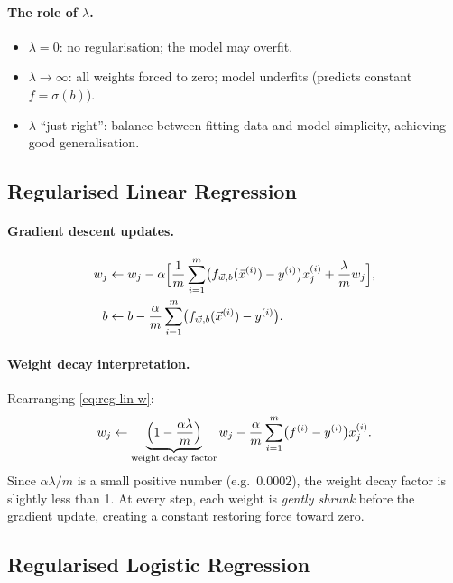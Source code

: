 \paragraph{The role of $\lambda$.}
\begin{itemize}
\item $\lambda=0$: no regularisation; the model may overfit.
\item $\lambda\to\infty$: all weights forced to zero; model underfits
  (predicts constant $f=\sigma(b)$).
\item $\lambda$ ``just right'': balance between fitting data and model
  simplicity, achieving good generalisation.
\end{itemize}

\subsection{Regularised Linear Regression}

\paragraph{Gradient descent updates.}
\begin{align}
w_j&\leftarrow w_j-\alpha\Bigl[\frac{1}{m}\sum_{i=1}^m
  \bigl(f_{\vec{w},b}(\vec{x}^{(i)})-y^{(i)}\bigr)x_j^{(i)}
  +\frac{\lambda}{m}w_j\Bigr],\label{eq:reg-lin-w}\\
b  &\leftarrow b-\frac{\alpha}{m}\sum_{i=1}^m
  \bigl(f_{\vec{w},b}(\vec{x}^{(i)})-y^{(i)}\bigr).\label{eq:reg-lin-b}
\end{align}

\paragraph{Weight decay interpretation.}
Rearranging \eqref{eq:reg-lin-w}:
\[
w_j\leftarrow\underbrace{\Bigl(1-\frac{\alpha\lambda}{m}\Bigr)}_{\text{weight decay factor}}w_j
-\frac{\alpha}{m}\sum_{i=1}^m\bigl(f^{(i)}-y^{(i)}\bigr)x_j^{(i)}.
\]
Since $\alpha\lambda/m$ is a small positive number (e.g.\ $0.0002$), the weight
decay factor is slightly less than 1. At every step, each weight is
\emph{gently shrunk} before the gradient update, creating a constant restoring
force toward zero.

\subsection{Regularised Logistic Regression}


